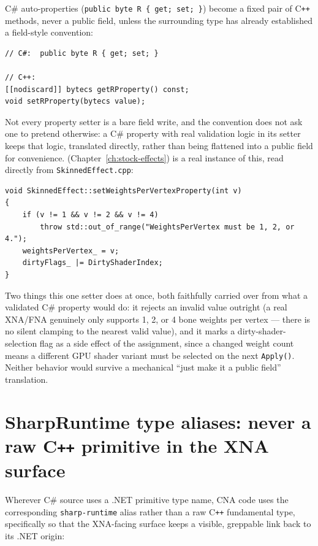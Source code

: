 C\# auto-properties (\texttt{public byte R \{ get; set; \}}) become a fixed pair of C\texttt{++}
methods, never a public field, unless the surrounding type has already established a
field-style convention:

\begin{lstlisting}
// C#:  public byte R { get; set; }

// C++:
[[nodiscard]] bytecs getRProperty() const;
void setRProperty(bytecs value);
\end{lstlisting}

Not every property setter is a bare field write, and the convention does not ask one to
pretend otherwise: a C\# property with real validation logic in its setter keeps that logic,
translated directly, rather than being flattened into a public field for convenience.
 (Chapter~\ref{ch:stock-effects}) is a real instance
of this, read directly from \texttt{SkinnedEffect.cpp}:

\begin{lstlisting}
void SkinnedEffect::setWeightsPerVertexProperty(int v)
{
    if (v != 1 && v != 2 && v != 4)
        throw std::out_of_range("WeightsPerVertex must be 1, 2, or 4.");
    weightsPerVertex_ = v;
    dirtyFlags_ |= DirtyShaderIndex;
}
\end{lstlisting}

Two things this one setter does at once, both faithfully carried over from what a validated
C\# property would do: it rejects an invalid value outright (a real XNA/FNA
 genuinely only supports 1, 2, or 4 bone weights per vertex --- there is
no silent clamping to the nearest valid value), and it marks a dirty-shader-selection flag as a
side effect of the assignment, since a changed weight count means a different GPU shader
variant must be selected on the next \texttt{Apply()}. Neither behavior would survive a
mechanical ``just make it a public field'' translation.

\section{SharpRuntime type aliases: never a raw C\texttt{++} primitive in the XNA surface}

Wherever C\# source uses a .NET primitive type name, CNA code uses the corresponding
\texttt{sharp-runtime} alias rather than a raw C\texttt{++} fundamental type, specifically so
that the XNA-facing surface keeps a visible, greppable link back to its .NET origin:

